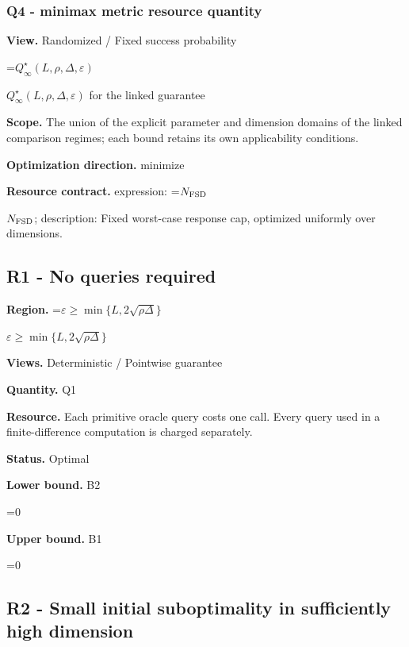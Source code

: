 \documentclass[10pt,a4paper]{article}
\newcommand{\AtlasMath}[1]{\par\begingroup\centering\setbox0=\hbox{$\displaystyle #1$}\ifdim\wd0>1.4\linewidth\typeout{ATLAS WIDE FORMULA: \the\wd0}\fi\ifdim\wd0>\linewidth\resizebox{\linewidth}{!}{\box0}\else\box0\fi\par\endgroup}
\newcommand{\AtlasInlineMath}[1]{\begingroup\setbox0=\hbox{$#1$}\ifdim\wd0>.4\linewidth\endgroup\AtlasMath{#1}\else\endgroup$#1$\fi}
\begin{document}
\subsubsection{Q4 - minimax metric resource quantity}


\textbf{View.} Randomized / Fixed success probability



\AtlasInlineMath{Q^\star_\infty(L,\rho,\Delta,\varepsilon)} for the linked guarantee



\textbf{Scope.} The union of the explicit parameter and dimension domains of the linked comparison regimes; each bound retains its own applicability conditions.



\textbf{Optimization direction.} minimize



\textbf{Resource contract.} expression: \AtlasInlineMath{N_{\rm FSD}}; description: Fixed worst-case response cap, optimized uniformly over dimensions.



\subsection{R1 - No queries required}


\textbf{Region.} \AtlasInlineMath{\varepsilon\ge\min\{L,2\sqrt{\rho\Delta}\}}



\textbf{Views.} Deterministic / Pointwise guarantee



\textbf{Quantity.} Q1



\textbf{Resource.} Each primitive oracle query costs one call. Every query used in a finite-difference computation is charged separately.



\textbf{Status.} Optimal



\textbf{Lower bound.} B2



\AtlasMath{0}


\textbf{Upper bound.} B1



\AtlasMath{0}


\subsection{R2 - Small initial suboptimality in sufficiently high dimension}
\end{document}
